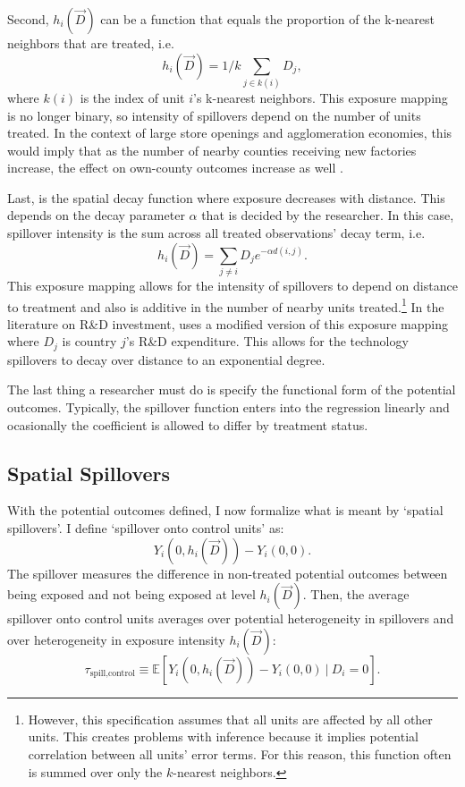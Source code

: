 \documentclass[11pt]{article}
\begin{document}
Second, $h_i(\vec{D})$ can be a function that equals the proportion of the k-nearest neighbors that are treated, i.e. \[
    h_i(\vec{D}) = 1/k \sum_{j \in k(i)} D_j,
\]
where $k(i)$ is the index of unit $i$'s k-nearest neighbors. This exposure mapping is no longer binary, so intensity of spillovers depend on the number of units treated. In the context of large store openings and agglomeration economies, this would imply that as the number of nearby counties receiving new factories increase, the effect on own-county outcomes increase as well \citep{Basker_2005}.

Last, is the spatial decay function where exposure decreases with distance. This depends on the decay parameter $\alpha$ that is decided by the researcher. In this case, spillover intensity is the sum across all treated observations' decay term, i.e. \[ 
    h_i(\vec{D}) = \sum_{j \neq i} D_j e^{-\alpha d(i,j)}.
\] 
This exposure mapping allows for the intensity of spillovers to depend on distance to treatment and also is additive in the number of nearby units treated.\footnote{However, this specification assumes that all units are affected by all other units. This creates problems with inference because it implies potential correlation between all units' error terms. For this reason, this function often is summed over only the $k$-nearest neighbors.} In the literature on R\&D investment, \citet{Keller_2002} uses a modified version of this exposure mapping where $D_j$ is country $j$'s R\&D expenditure. This allows for the technology spillovers to decay over distance to an exponential degree.

The last thing a researcher must do is specify the functional form of the potential outcomes. Typically, the spillover function enters into the regression linearly and ocasionally the coefficient is allowed to differ by treatment status. 



\subsection{Spatial Spillovers}

With the potential outcomes defined, I now formalize what is meant by `spatial spillovers'. I define `spillover onto control units' as: \[
    Y_{i}(0, h_i(\vec{D})) - Y_{i}(0, 0).
\] 
The spillover measures the difference in non-treated potential outcomes between being exposed and not being exposed at level $h_i(\vec{D})$. Then, the average spillover onto control units averages over potential heterogeneity in spillovers and over heterogeneity in exposure intensity $h_i(\vec{D})$: \[
    \tau_{\text{spill,control}} \equiv \mathbb{E} \left[ Y_{i}(0, h_i(\vec{D})) - Y_{i}(0, 0) \ \vert \ D_i = 0 \right].
\]
\end{document}
